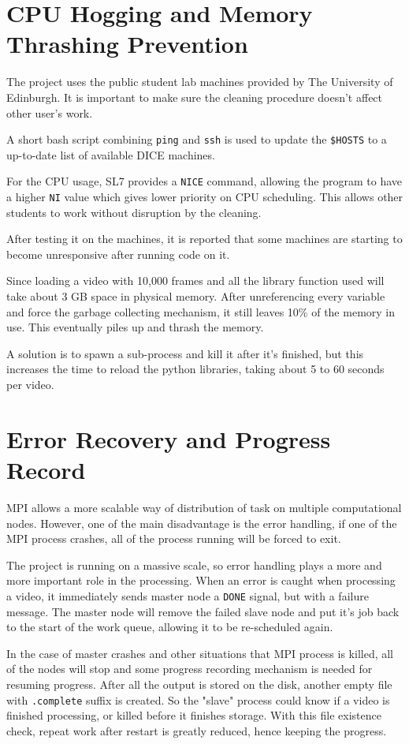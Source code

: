 \documentclass[bsc,logo,twoside,fullspacing,parskip]{infthesis}
\begin{document}
\section{CPU Hogging and Memory Thrashing Prevention}

The project uses the public student lab machines provided by The University of Edinburgh. 
It is important to make sure the cleaning procedure doesn't affect other user's work.

A short bash script combining {\tt ping} and {\tt ssh} is used to update the {\tt \$HOSTS} to a up-to-date list of available DICE machines.

For the CPU usage, SL7 provides a {\tt NICE} command, allowing the program to have a higher {\tt NI} value which gives lower priority on CPU scheduling. This allows other students to work without disruption by the cleaning.

After testing it on the machines, it is reported that some machines are starting to become unresponsive after running code on it.

Since loading a video with 10,000 frames and all the library function used will take about 3 GB space in physical memory. 
After unreferencing every variable and force the garbage collecting mechanism, it still leaves 10\% of the memory in use. This eventually piles up and thrash the memory. 

A solution is to spawn a sub-process and kill it after it's finished, but this increases the time to reload the python libraries, taking about 5 to 60 seconds per video.

\section{Error Recovery and Progress Record}

MPI allows a more scalable way of distribution of task on multiple computational nodes.
However, one of the main disadvantage is the error handling, if one of the MPI process crashes, all of the process running will be forced to exit.

The project is running on a massive scale, so error handling plays a more and more important role in the processing. 
When an error is caught when processing a video, it immediately sends master node a {\tt DONE} signal, but with a failure message. The master node will remove the failed slave node and put it's job back to the start of the work queue, allowing it to be re-scheduled again.

In the case of master crashes and other situations that MPI process is killed, all of the nodes will stop and some progress recording mechanism is needed for resuming progress. After all the output is stored on the disk, another empty file with {\tt .complete} suffix is created. So the "slave" process could know if a video is finished processing, or killed before it finishes storage. With this file existence check, repeat work after restart is greatly reduced, hence keeping the progress.
\end{document}
